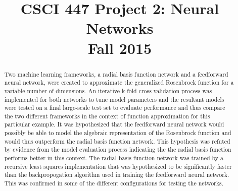 \documentclass[conference]{IEEEtran}
\begin{document}
\title{CSCI 447 Project 2: Neural Networks \\ Fall 2015}

\author{
  \and
  \and
  }

\maketitle

\begin{abstract}
  Two machine learning frameworks, a radial basis function network and a feedforward neural network, were created to approximate the generalized Rosenbrock function for a variable number of dimensions. An iterative k-fold cross validation process was implemented for both networks to tune model parameters and the resultant models were tested on a final large-scale test set to evaluate performance and thus compare the two different frameworks in the context of function approximation for this particular example. It was hypothesized that the feedforward neural network would possibly be able to model the algebraic representation of the Rosenbrock function and would thus outperform the radial basis function network. This hypothesis was refuted by evidence from the model evaluation process indicating the the radial basis function performs better in this context. The radial basis function network was trained by a recursive least squares implementation that was hypothesized to be significantly faster than the backpropogation algorithm used in training the feedforward neural network. This was confirmed in some of the different configurations for testing the networks.
  
\end{abstract}
\end{document}
